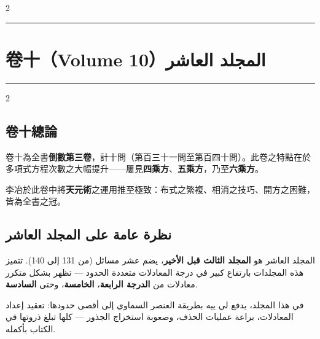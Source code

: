 \documentclass[11pt,a4paper]{article}
\newcommand{\ar}[1]{\arabicfont\beginR #1\endR}
\newcommand{\longline}{\noindent\rule{\textwidth}{0.4pt}}
\newcommand{\arnote}[1]{\textcolor{arabicblue}{\ar{#1}}}
\begin{document}
\begin{paracol}{2}
\end{paracol}

\vspace{0.5cm}
\begin{center}
\longline
\end{center}

\newpage

\section{卷十（Volume 10）\hfill \ar{المجلد العاشر}}
\label{sec:vol10}

\begin{center}
\longline
\end{center}

\begin{paracol}{2}

\begin{leftcolumn*}
\subsection*{卷十總論}
卷十為全書\textbf{倒數第三卷}，計十問（第百三十一問至第百四十問）。此卷之特點在於多項式方程次數之大幅提升——屢見\textbf{四乘方}、\textbf{五乘方}，乃至\textbf{六乘方}。

李冶於此卷中將\textbf{天元術}之運用推至極致：布式之繁複、相消之技巧、開方之困難，皆為全書之冠。
\end{leftcolumn*}

\begin{rightcolumn}
\subsection*{\ar{نظرة عامة على المجلد العاشر}}
\arnote{المجلد العاشر هو \textbf{المجلد الثالث قبل الأخير}، يضم عشر مسائل (من 131 إلى 140). تتميز هذه المجلدات بارتفاع كبير في درجة المعادلات متعددة الحدود — تظهر بشكل متكرر معادلات من \textbf{الدرجة الرابعة}، \textbf{الخامسة}، وحتى \textbf{السادسة}.

في هذا المجلد، يدفع لي ييه بطريقة العنصر السماوي إلى أقصى حدودها: تعقيد إعداد المعادلات، براعة عمليات الحذف، وصعوبة استخراج الجذور — كلها تبلغ ذروتها في الكتاب بأكمله.}
\end{rightcolumn}

\end{paracol}
\end{document}
